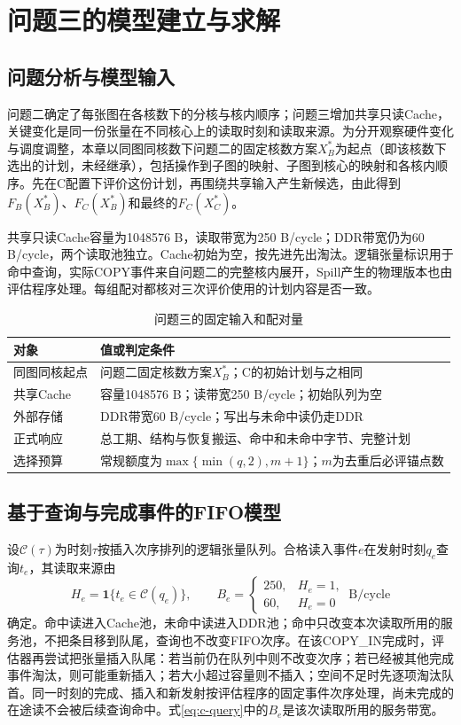 \section{问题三的模型建立与求解}
\label{sec:question-three}

\subsection{问题分析与模型输入}
问题二确定了每张图在各核数下的分核与核内顺序；问题三增加共享只读Cache，关键变化是同一份张量在不同核心上的读取时刻和读取来源。为分开观察硬件变化与调度调整，本章以同图同核数下问题二的固定核数方案$X_B^*$为起点（即该核数下选出的计划，未经继承），包括操作到子图的映射、子图到核心的映射和各核内顺序。先在C配置下评价这份计划，再围绕共享输入产生新候选，由此得到$F_B(X_B^*)$、$F_C(X_B^*)$和最终的$F_C(X_C^*)$。

共享只读Cache容量为1048576 B，读取带宽为250 B/cycle；DDR带宽仍为60 B/cycle，两个读取池独立。Cache初始为空，按先进先出淘汰。逻辑张量标识用于命中查询，实际COPY事件来自问题二的完整核内展开，Spill产生的物理版本也由评估程序处理。每组配对都核对三次评价使用的计划内容是否一致。
\begin{table}[H]\centering\caption{问题三的固定输入和配对量}\label{tab:c-inputs}
\begin{tabularx}{\linewidth}{lY}\toprule
对象 & 值或判定条件\\\midrule
同图同核起点 & 问题二固定核数方案$X_B^*$；C的初始计划与之相同\\
共享Cache & 容量1048576 B；读带宽250 B/cycle；初始队列为空\\
外部存储 & DDR带宽60 B/cycle；写出与未命中读仍走DDR\\
正式响应 & 总工期、结构与恢复搬运、命中和未命中字节、完整计划\\
选择预算 & 常规额度为$\max\{\min(q,2),m+1\}$；$m$为去重后必评锚点数\\\bottomrule
\end{tabularx}\end{table}

\subsection{基于查询与完成事件的FIFO模型}
设$\mathcal C(\tau)$为时刻$\tau$按插入次序排列的逻辑张量队列。合格读入事件$e$在发射时刻$q_e$查询$t_e$，其读取来源由
\begin{equation}
H_e=\mathbf 1\{t_e\in\mathcal C(q_e)\},\qquad
B_e=\begin{cases}250,&H_e=1,\\60,&H_e=0\end{cases}\ \mathrm{B/cycle}
\label{eq:c-query}
\end{equation}
确定。命中读进入Cache池，未命中读进入DDR池；命中只改变本次读取所用的服务池，不把条目移到队尾，查询也不改变FIFO次序。在该COPY\_IN完成时，评估器再尝试把张量插入队尾：若当前仍在队列中则不改变次序；若已经被其他完成事件淘汰，则可能重新插入；若大小超过容量则不插入；空间不足时先逐项淘汰队首。同一时刻的完成、插入和新发射按评估程序的固定事件次序处理，尚未完成的在途读不会被后续查询命中。式\eqref{eq:c-query}中的$B_e$是该次读取所用的服务带宽。

